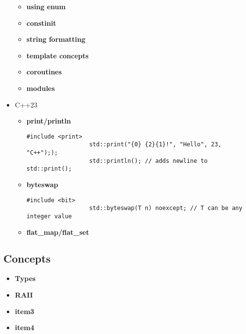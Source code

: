 \documentclass{article}
\begin{document}
\begin{itemize}
\begin{itemize}
		      \item \textbf{using enum}
		      \item \textbf{constinit}
		      \item \textbf{string formatting}
		      \item \textbf{template concepts}
		      \item \textbf{coroutines}
		      \item \textbf{modules}
	      \end{itemize}
	\item C++23
	      \begin{itemize}
		      \item \textbf{print/println}
			      \begin{lstlisting}[style=cpp]
			      #include <print>
			      std::print("{0} {2}{1}!", "Hello", 23, "C++"););
			      std::println(); // adds newline to std::print();
			      \end{lstlisting}
		      \item \textbf{byteswap}
			      \begin{lstlisting}[style=cpp]
			      #include <bit>
			      std::byteswap(T n) noexcept; // T can be any integer value
			      \end{lstlisting}
		      \item \textbf{flat\_map/flat\_set}
	      \end{itemize}
\end{itemize}
\subsection{Concepts}
\begin{itemize}
	\item \textbf{Types}
	\item \textbf{RAII}
	\item \textbf{item3}
	\item \textbf{item4}
\end{itemize}
\end{document}
